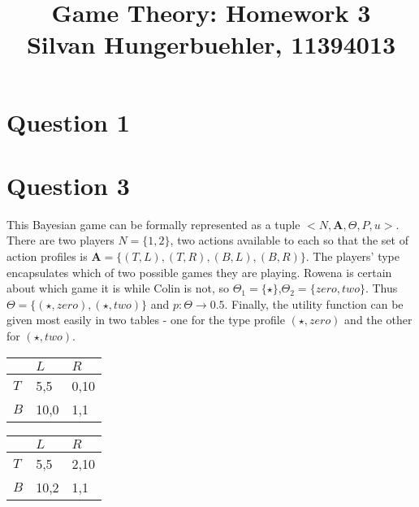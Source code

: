 \documentclass[10pt,a4paper]{article}
\title{%
  Game Theory: Homework 3 \\
  \large Silvan Hungerbuehler, 11394013}
\date{}
\begin{document}
\maketitle

\section*{Question 1}


\section*{Question 3}
This Bayesian game can be formally represented as a tuple $<N,\boldsymbol{A}, \Theta, P, u>$. There are two players $N=\{1,2\}$, two actions available to each so that the set of action profiles is $\boldsymbol{A}=\{(T,L),(T,R),(B,L),(B,R)\}$. The players' type encapsulates which of two possible games they are playing. Rowena is certain about which game it is while Colin is not, so $\Theta_1=\{\star\}$,$\Theta_2=\{zero,two\}$. Thus $\Theta=\{(\star,zero),(\star,two)\}$ and $p: \Theta \rightarrow 0.5$. Finally, the utility function can be given most easily in two tables - one for the type profile $(\star,zero)$ and the other for $(\star,two)$.
\begin{table}[h]
\centering
\begin{tabular}[l]{|l|l|l|}
\hline
          & $L$ & $R$  \\ \hline
$T$     & 5,5   & 0,10 \\ \hline
$B$		& 10,0	& 1,1 \\ \hline
\end{tabular}
\quad
\begin{tabular}[r]{|l|l|l|}
\hline
          & $L$ & $R$  \\ \hline
$T$     & 5,5   & 2,10 \\ \hline
$B$		& 10,2	& 1,1 \\ \hline
\end{tabular}
\end{table}
\end{document}

